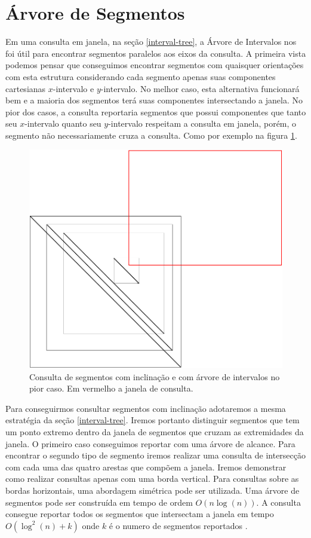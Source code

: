 
\section{Árvore de Segmentos}
Em uma consulta em janela, na seção \ref{interval-tree}, a Árvore de Intervalos nos foi útil para encontrar segmentos paralelos aos eixos da consulta. A primeira vista podemos pensar que conseguimos encontrar segmentos com quaisquer orientações com esta estrutura considerando cada segmento apenas suas componentes cartesianas $x$-intervalo e $y$-intervalo. No melhor caso, esta alternativa funcionará bem e a maioria dos segmentos terá suas componentes intersectando a janela. No pior dos casos, a consulta reportaria segmentos que possui componentes que tanto seu $x$-intervalo quanto seu $y$-intervalo respeitam a consulta em janela, porém, o segmento não necessariamente cruza a consulta. Como por exemplo na figura \ref{fig:interval_tree_worst_case}.

\begin{figure}[h!]
    \centering
    \includegraphics[scale=0.5]{images/interval_tree_fail.pdf}
    \caption{Consulta de segmentos com inclinação e com árvore de intervalos no pior caso. Em vermelho a janela de consulta.}
    \label{fig:interval_tree_worst_case}
\end{figure}

Para conseguirmos consultar segmentos com inclinação adotaremos a mesma estratégia da seção \ref{interval-tree}. Iremos portanto distinguir segmentos que tem um ponto extremo dentro da janela de segmentos que cruzam as extremidades da janela. O primeiro caso conseguimos reportar com uma árvore de alcance. Para encontrar o segundo tipo de segmento iremos realizar uma consulta de intersecção com cada uma das quatro arestas que compõem a janela. Iremos demonstrar como realizar consultas apenas com uma borda vertical. Para consultas sobre as bordas horizontais, uma abordagem simétrica pode ser utilizada. Uma árvore de segmentos pode ser construída em tempo de ordem $O(n\log(n))$. A consulta consegue reportar todos os segmentos que intersectam a janela em tempo $O(\log^2(n) +k)$ onde $k$ é o numero de segmentos reportados \cite{cg08}.

